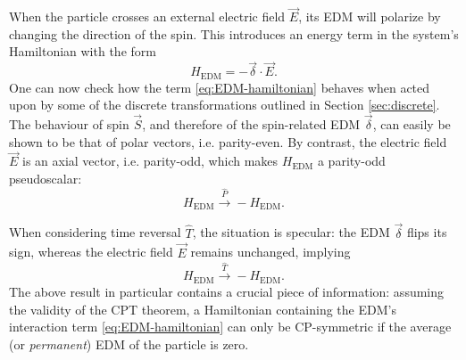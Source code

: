 When the particle crosses an external electric field $\vec{E}$, its EDM will polarize by changing the direction of the spin. This introduces an energy term in the system's Hamiltonian with the form
\begin{equation}
H_\text{EDM} = - \vec{\delta} \cdot \vec{E} .
\label{eq:EDM-hamiltonian}
\end{equation}
One can now check how the term \eqref{eq:EDM-hamiltonian} behaves when acted upon by some of the discrete transformations outlined in Section \ref{sec:discrete}.
The behaviour of spin $\vec{S}$, and therefore of the spin-related EDM $\vec{\delta}$, can easily be shown to be 
that of polar vectors, i.e. parity-even.
By contrast, the electric field $\vec{E}$ is an axial vector, i.e. parity-odd, which makes $H_\text{EDM}$ a parity-odd pseudoscalar:
\begin{equation}
H_\text{EDM} \xrightarrow{\hat{P}} - H_\text{EDM}.
\label{eq:EDM-hamiltonian-under-P}
\end{equation}

When considering time reversal $\hat{T}$, the situation is specular:
the EDM $\vec{\delta}$ flips its sign, whereas the electric field $\vec{E}$ remains unchanged, implying
\begin{equation}
H_\text{EDM} \xrightarrow{\hat{T}} - H_\text{EDM}.
\label{eq:EDM-hamiltonian-under-T}
\end{equation}
The above result in particular contains a crucial piece of information:
assuming the validity of the CPT theorem, a Hamiltonian containing the EDM's interaction term \eqref{eq:EDM-hamiltonian} can only be CP-symmetric if the average (or \textit{permanent}) EDM of the particle is zero.

